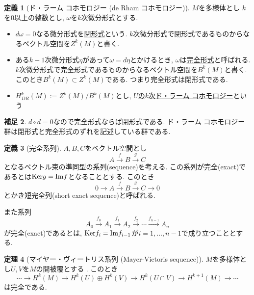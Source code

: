 \documentclass[dvipdfmx,a4paper,11pt]{article}
\newcommand{\Ker}{{\rm Ker}}
\newcommand{\ima}{{\rm Im}}
\theoremstyle{definition}
\newtheorem{thm}{定理}
\newtheorem{dfn}[thm]{定義}
\newtheorem{rem}[thm]{補足}
\begin{document}
    
\begin{tcolorbox}[
    colback = white,
    colframe = green!35!black,
    fonttitle = \bfseries,
    breakable = true]
\begin{dfn}[ド・ラーム コホモロジー (de Rham コホモロジー)]
$M$を多様体とし $k$を0以上の整数とし, $\omega$を$k$次微分形式とする. 
\begin{itemize}
 \setlength{\parskip}{0cm}
  \setlength{\itemsep}{2pt}
\item  $d\omega=0$なる微分形式を\underline{閉形式}という. $k$次微分形式で閉形式であるものからなるベクトル空間を$Z^k(M)$と書く. 
\item ある$k-1$次微分形式$\eta$があって$\omega = d \eta$とかけるとき, $\omega$は\underline{完全形式}と呼ばれる. $k$次微分形式で完全形式であるものからなるベクトル空間を$B^k(M)$と書く. このとき$B^k(M) \subset Z^k (M)$である. つまり完全形式は閉形式である. 
\item $H^{k}_{DR}(M) := Z^k (M)/B^k(M)$とし, \underline{$U$の$k$次ド・ラーム コホモロジー}という
 \end{itemize}
\end{dfn}
\end{tcolorbox}  


\begin{rem}
$d \circ d =0$なので完全形式ならば閉形式である.  ド・ラーム コホモロジー群は閉形式と完全形式のずれを記述している群である.
\end{rem}


\begin{tcolorbox}[
    colback = white,
    colframe = green!35!black,
    fonttitle = \bfseries,
    breakable = true]
\begin{dfn}[完全系列]
$A,B,C$をベクトル空間とし
$$
A \stackrel{f}{\to} B \stackrel{g}{\to} C
$$
となるベクトル束の準同型の系列(sequence)を考える. 
この系列が完全(exact)であるとは$\Ker g = \ima f$となることとする. 
このとき
$$
0 \to A \stackrel{f}{\to} B \stackrel{g}{\to} C \to 0
$$
とかき短完全列(short exact sequence)と呼ばれる. 

また系列
$$
A_0 \stackrel{f_0}{\to} A_1 \stackrel{f_1}{\to} A_2 \stackrel{f_2}{\to}  \cdots \stackrel{f_{n-1}}{\to} A_{n}
$$
が完全(exact)であるとは, $\Ker f_{i}= \ima f_{i-1}$が$i=1, \ldots, n-1$で成り立つこととする. 
\end{dfn}
\end{tcolorbox}  


\begin{tcolorbox}[
    colback = white,
    colframe = green!35!black,
    fonttitle = \bfseries,
    breakable = true]
\begin{thm}[マイヤー・ヴィートリス系列 (Mayer-Vietoris sequence)]
$M$を多様体とし$U, V$を$M$の開被覆とする . 
このとき
\[
\cdots \longrightarrow H^k(M) \longrightarrow H^k(U) \oplus H^k(V) \longrightarrow H^k(U \cap V) \longrightarrow H^{k+1}(M) \longrightarrow \cdots
\]
は完全である. 
\end{thm}
\end{tcolorbox} 
\end{document}
